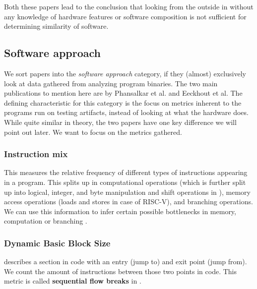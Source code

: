 \documentclass[../bachelor_paper.tex]{subfiles}
\begin{document}
Both these papers lead to the conclusion that looking from the outside in without any knowledge of hardware features or software composition is not sufficient for determining similarity of software.

\subsection{Software approach}
	\label{ch:theory/similarity/software}
We sort papers into the \emph{software approach} category, if they (almost) exclusively look at data gathered from analyzing program binaries. The two main publications to mention here are by Phansalkar et al. \cite{phansalkarMeasuringProgramSimilarity2005} and Eeckhout et al. \cite{eeckhoutDesigningComputerArchitecture2003} The defining characteristic for this category is the focus on metrics inherent to the programs run on testing artifacts, instead of looking at what the hardware does. While quite similar in theory, the two papers have one key difference we will point out later. We want to focus on the metrics gathered.

\subsubsection{Instruction mix} 
This measures the relative frequency of different types of instructions appearing in a program. This splits up in computational operations (which is further split up into logical, integer, and byte manipulation and shift operations in \cite{eeckhoutDesigningComputerArchitecture2003}), memory access operations (loads and stores in case of RISC-V), and branching operations. We can use this information to infer certain possible bottlenecks in memory, computation or branching \cite{phansalkarMeasuringProgramSimilarity2005}.

\subsubsection{Dynamic Basic Block Size} 
describes a section in code with an entry (jump to) and exit point (jump from). We count the amount of instructions between those two points in code. This metric is called \textbf{sequential flow breaks} in \cite{eeckhoutDesigningComputerArchitecture2003}.
\end{document}
